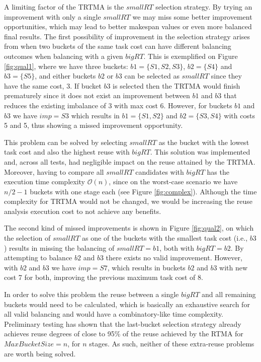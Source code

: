 A limiting factor of the TRTMA is the $smallRT$ selection strategy. By trying an improvement with only a single $smallRT$ we may miss some better improvement opportunities, which may lead to better makespan values or even more balanced final results. The first possibility of improvement in the selection strategy arises from when two buckets of the same task cost can have different balancing outcomes when balancing with a given $bigRT$. This is exemplified on Figure \ref{fig:qual1}, where we have three buckets: $b1=\{S1,S2,S3\}$, $b2=\{S4\}$ and $b3=\{S5\}$, and either buckets $b2$ or $b3$ can be selected as $smallRT$ since they have the same cost, 3. If bucket $b3$ is selected then the TRTMA would finish prematurely since it does not exist an improvement between $b1$ and $b3$ that reduces the existing imbalance of 3 with max cost 6. However, for buckets $b1$ and $b3$ we have $imp={S3}$ which results in $b1=\{S1,S2\}$ and $b2=\{S3,S4\}$ with costs 5 and 5, thus showing a missed improvement opportunity.

This problem can be solved by selecting $smallRT$ as the bucket with the lowest task cost and also the highest reuse with $bigRT$. This solution was implemented and, across all tests, had negligible impact on the reuse attained by the TRTMA. Moreover, having to compare all $smallRT$ candidates with $bigRT$ has the execution time complexity $\mathcal{O}(n)$, since on the worst-case scenario we have $n/2-1$ buckets with one stage each (see Figure \ref{fig:complex}). Although the time complexity for TRTMA would not be changed, we would be increasing the reuse analysis execution cost to not achieve any benefits.

The second kind of missed improvements is shown in Figure \ref{fig:qual2}, on which the selection of $smallRT$ as one of the buckets with the smallest task cost (i.e., $b3$) results in missing the balancing of $smallRT = b1$, both with $bigRT = b2$. By attempting to balance $b2$ and $b3$ there exists no valid improvement. However, with $b2$ and $b3$ we have $imp=S7$, which results in buckets $b2$ and $b3$ with new cost 7 for both, improving the previous maximum task cost of 8.

In order to solve this problem the reuse between a single $bigRT$ and all remaining buckets would need to be calculated, which is basically an exhaustive search for all valid balancing and would have a combinatory-like time complexity. Preliminary testing has shown that the last-bucket selection strategy already achieves reuse degrees of close to 95\% of the reuse achieved by the RTMA for $MaxBucketSize = n$, for $n$ stages. As such, neither of these extra-reuse problems are worth being solved.



